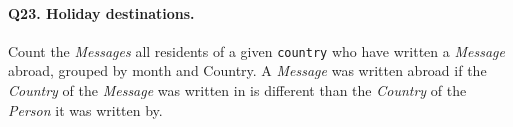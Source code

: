 \paragraph{\textbf{Q23}. Holiday destinations.}
Count the \emph{Messages} all residents of a given \texttt{country} who
have written a \emph{Message} abroad, grouped by month and Country. A
\emph{Message} was written abroad if the \emph{Country} of the
\emph{Message} was written in is different than the \emph{Country} of
the \emph{Person} it was written by.
